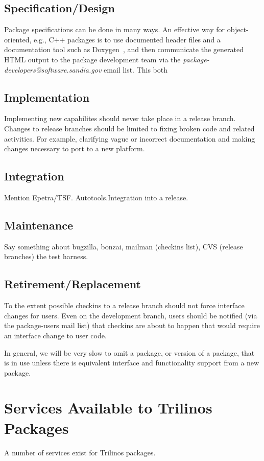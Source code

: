 \documentclass[12pt,relax]{SANDreport}
\begin{document}
\subsection{Specification/Design}
Package specifications can be done in many ways.  An effective way for 
object-oriented, e.g., C++ packages is to use documented header files and a 
documentation tool such as Doxygen~\cite{doxyen}, and then communicate the 
generated HTML output to the package development team via the 
{\it package-developers@software.sandia.gov} email list.  This both

\subsection{Implementation}
Implementing new capabilites should never take place in a release branch.  
Changes to release branches should be limited to fixing broken code and 
related activities.  For example, clarifying vague or incorrect documentation 
and making changes necessary to port to a new platform.

\subsection{Integration}
Mention Epetra/TSF. Autotools.Integration into a release.

\subsection{Maintenance}
Say something about bugzilla, bonzai, mailman (checkins list), CVS (release 
branches) the test harness.

\subsection{Retirement/Replacement}
To the extent possible checkins to a release branch should not force interface 
changes for users.  Even on the development branch, users should be notified 
(via the package-users mail list) that checkins are about to happen that would 
require an interface change to user code.

In general, we will be very slow to omit a package, or version of a package, 
that is in use unless there is equivalent interface and functionality support 
from a new package.

	\section{Services Available to Trilinos Packages}
	A number of services exist for Trilinos packages.
\end{document}
